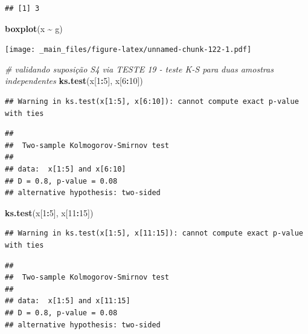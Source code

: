 \documentclass[
]{book}
\newenvironment{Shaded}{\begin{snugshade}}{\end{snugshade}}
\newcommand{\CommentTok}[1]{\textcolor[rgb]{0.56,0.35,0.01}{\textit{#1}}}
\newcommand{\DecValTok}[1]{\textcolor[rgb]{0.00,0.00,0.81}{#1}}
\newcommand{\KeywordTok}[1]{\textcolor[rgb]{0.13,0.29,0.53}{\textbf{#1}}}
\newcommand{\NormalTok}[1]{#1}
\newcommand{\OperatorTok}[1]{\textcolor[rgb]{0.81,0.36,0.00}{\textbf{#1}}}
\newcommand{\StringTok}[1]{\textcolor[rgb]{0.31,0.60,0.02}{#1}}
\theoremstyle{definition}
\theoremstyle{definition}
\theoremstyle{definition}
\theoremstyle{remark}
\begin{document}
\begin{verbatim}
## [1] 3
\end{verbatim}

\begin{Shaded}
\begin{Highlighting}[]
\KeywordTok{boxplot}\NormalTok{(x }\OperatorTok{\textasciitilde{}}\StringTok{ }\NormalTok{g)}
\end{Highlighting}
\end{Shaded}

\texttt{[image: \_main\_files/figure-latex/unnamed-chunk-122-1.pdf]}

\begin{Shaded}
\begin{Highlighting}[]
\CommentTok{\# validando suposição S4 via TESTE 19 {-} teste K{-}S para duas amostras independentes}
\KeywordTok{ks.test}\NormalTok{(x[}\DecValTok{1}\OperatorTok{:}\DecValTok{5}\NormalTok{], x[}\DecValTok{6}\OperatorTok{:}\DecValTok{10}\NormalTok{])}
\end{Highlighting}
\end{Shaded}

\begin{verbatim}
## Warning in ks.test(x[1:5], x[6:10]): cannot compute exact p-value with ties
\end{verbatim}

\begin{verbatim}
## 
##  Two-sample Kolmogorov-Smirnov test
## 
## data:  x[1:5] and x[6:10]
## D = 0.8, p-value = 0.08
## alternative hypothesis: two-sided
\end{verbatim}

\begin{Shaded}
\begin{Highlighting}[]
\KeywordTok{ks.test}\NormalTok{(x[}\DecValTok{1}\OperatorTok{:}\DecValTok{5}\NormalTok{], x[}\DecValTok{11}\OperatorTok{:}\DecValTok{15}\NormalTok{])}
\end{Highlighting}
\end{Shaded}

\begin{verbatim}
## Warning in ks.test(x[1:5], x[11:15]): cannot compute exact p-value with ties
\end{verbatim}

\begin{verbatim}
## 
##  Two-sample Kolmogorov-Smirnov test
## 
## data:  x[1:5] and x[11:15]
## D = 0.8, p-value = 0.08
## alternative hypothesis: two-sided
\end{verbatim}
\end{document}
